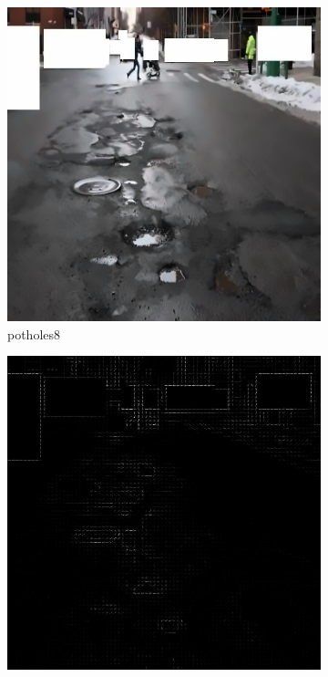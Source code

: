 \documentclass[a4paper, 10pt]{article}
\begin{document}
\begin{figure}[htbp]
		\begin{subfigure}{0.24\textwidth}
			\includegraphics[width=\linewidth]{picture/alldata_filled/potholes8}
			\caption{potholes8}
			\label{fig: potholes8 filled}	
		\end{subfigure}
		\begin{subfigure}{0.24\textwidth}
			\includegraphics[width=\linewidth]{picture/alldata_filled_hog/potholes8}

\end{subfigure}
\end{figure}
\end{document}

